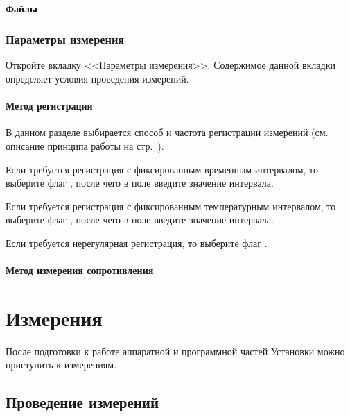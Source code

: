 \documentclass[12pt, a4paper, twocolumn]{report}
\begin{document}


\subsubsection{Файлы}



\subsection{Параметры измерения}

Откройте вкладку <<Параметры измерения>>. Содержимое данной вкладки определяет условия проведения измерений.

\subsubsection{Метод регистрации}
\label{sec_reg_method}

В данном разделе выбирается способ и частота регистрации измерений (см. описание принципа работы на стр.~\pageref{sec_registration_types}).

Если требуется регистрация с фиксированным временным интервалом, то выберите флаг , после чего в поле  введите значение интервала.

Если требуется регистрация с фиксированным температурным интервалом, то выберите флаг , после чего в поле  введите значение интервала.

Если требуется нерегулярная регистрация, то выберите флаг .

\subsubsection{Метод измерения сопротивления}



\chapter{Измерения}

После подготовки к работе аппаратной и программной частей Установки можно приступить к измерениям.

\section{Проведение измерений}
\end{document}
